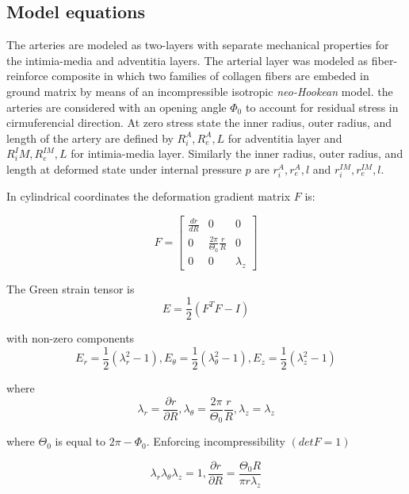 \documentclass[review]{elsarticle}
\begin{document}
\subsection{Model equations}

The arteries are modeled as two-layers with separate mechanical properties for the intimia-media and adventitia layers. The arterial layer was modeled
as fiber-reinforce composite in which two families of collagen fibers are embeded in ground matrix by means of an incompressible isotropic \emph{neo-Hookean} model.  the arteries are considered with 
an opening angle $\Phi_0$ to account for residual stress in cirmuferencial direction. At zero stress state the inner radius, outer radius, and length of the artery 
are defined by $R_{i}^A,R_{e}^A,L$ for adventitia layer and
$R_{i}^IM,R_{e}^{IM},L$ for intimia-media layer. Similarly the inner radius, outer radius, and
length at deformed state under internal pressure $p$ are $r_{i}^A,r_{e}^A,l$
and $r_{i}^{IM},r_{e }^{IM},l$.

In cylindrical coordinates the deformation gradient matrix $F$ is:

\begin{equation}
  F=  \left[\begin{array}{ccc}
        \frac{dr}{dR} & 0 & 0 \\
        0 & \frac{2\pi}{\Theta_0}\frac{r}{R} & 0 \\
    0 & 0 & \lambda_z \end{array} \right]
    \end{equation}

The Green strain tensor is
\begin{equation}
    E=\frac{1}{2}(F^TF-I)
\end{equation}

with non-zero components
\begin{equation}
    E_r=\frac{1}{2}(\lambda_r^2-1), E_{\theta}=\frac{1}{2}(\lambda_{\theta}^2-1), E_z=\frac{1}{2}(\lambda_z^2-1) 
\end{equation}

where
\begin{equation}
    \lambda_r=\frac{\partial r}{\partial R}, \lambda_{\theta}=\frac{2\pi}{\Theta_0}\frac{r}{R}, \lambda_z=\lambda_z
\end{equation}

where $\Theta_0$ is equal to $2\pi-\Phi_0$. Enforcing incompressibility $(detF=1)$

\begin{equation}
    \lambda_r\lambda_{\theta}\lambda_z=1, \frac{\partial r}{\partial R}=\frac{\Theta_0 R}{\pi r \lambda_z}
\end{equation}
\end{document}
